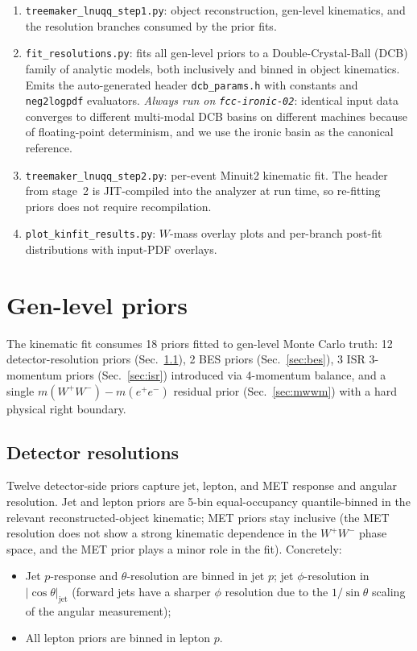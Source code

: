 \documentclass[11pt,a4paper]{article}
\newcommand{\WW}{\ensuremath{W^+W^-}\xspace}
\newcommand{\codename}[1]{\texttt{\small #1}}
\begin{document}
\begin{enumerate}[leftmargin=*]
  \item \codename{treemaker\_lnuqq\_step1.py}: object reconstruction,
        gen-level kinematics, and the resolution branches consumed by
        the prior fits.
  \item \codename{fit\_resolutions.py}: fits all gen-level priors to a
        Double-Crystal-Ball (DCB) family of analytic models, both
        inclusively and binned in object kinematics. Emits the
        auto-generated header \codename{dcb\_params.h} with constants
        and \codename{neg2logpdf} evaluators. \emph{Always run on
        \codename{fcc-ironic-02}}: identical input data converges to
        different multi-modal DCB basins on different machines because
        of floating-point determinism, and we use the ironic basin as
        the canonical reference.
  \item \codename{treemaker\_lnuqq\_step2.py}: per-event Minuit2
        kinematic fit. The header from stage~2 is JIT-compiled into the
        analyzer at run time, so re-fitting priors does not require
        recompilation.
  \item \codename{plot\_kinfit\_results.py}: $W$-mass overlay plots and
        per-branch post-fit distributions with input-PDF overlays.
\end{enumerate}


\section{Gen-level priors}\label{sec:priors}

The kinematic fit consumes 18 priors fitted to gen-level Monte Carlo
truth: 12 detector-resolution priors (Sec.~\ref{sec:resol}), 2 BES
priors (Sec.~\ref{sec:bes}), 3 ISR 3-momentum priors (Sec.~\ref{sec:isr})
introduced via 4-momentum balance, and a single $m(\WW)-m(e^+e^-)$
residual prior (Sec.~\ref{sec:mwwm}) with a hard physical right
boundary.

\subsection{Detector resolutions}\label{sec:resol}

Twelve detector-side priors capture jet, lepton, and MET response and
angular resolution. Jet and lepton priors are 5-bin equal-occupancy
quantile-binned in the relevant reconstructed-object kinematic; MET
priors stay inclusive (the MET resolution does not show a strong
kinematic dependence in the \WW phase space, and the MET prior plays a
minor role in the fit). Concretely:
\begin{itemize}[leftmargin=*]
  \item Jet $p$-response and $\theta$-resolution are binned in jet $p$;
        jet $\phi$-resolution in $|\cos\theta|_\text{jet}$ (forward
        jets have a sharper $\phi$ resolution due to the $1/\sin\theta$
        scaling of the angular measurement);
  \item All lepton priors are binned in lepton $p$.
\end{itemize}
\end{document}
